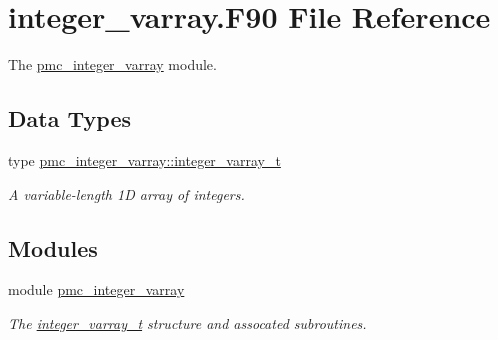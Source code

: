 \hypertarget{integer__varray_8_f90}{}\section{integer\+\_\+varray.\+F90 File Reference}
\label{integer__varray_8_f90}


The \mbox{\hyperlink{namespacepmc__integer__varray}{pmc\+\_\+integer\+\_\+varray}} module.  


\subsection*{Data Types}
\begin{DoxyCompactItemize}
\item 
type \mbox{\hyperlink{structpmc__integer__varray_1_1integer__varray__t}{pmc\+\_\+integer\+\_\+varray\+::integer\+\_\+varray\+\_\+t}}
\begin{DoxyCompactList}\small\item\em A variable-\/length 1D array of integers. \end{DoxyCompactList}\end{DoxyCompactItemize}
\subsection*{Modules}
\begin{DoxyCompactItemize}
\item 
module \mbox{\hyperlink{namespacepmc__integer__varray}{pmc\+\_\+integer\+\_\+varray}}
\begin{DoxyCompactList}\small\item\em The \mbox{\hyperlink{structpmc__integer__varray_1_1integer__varray__t}{integer\+\_\+varray\+\_\+t}} structure and assocated subroutines. \end{DoxyCompactList}\end{DoxyCompactItemize}
